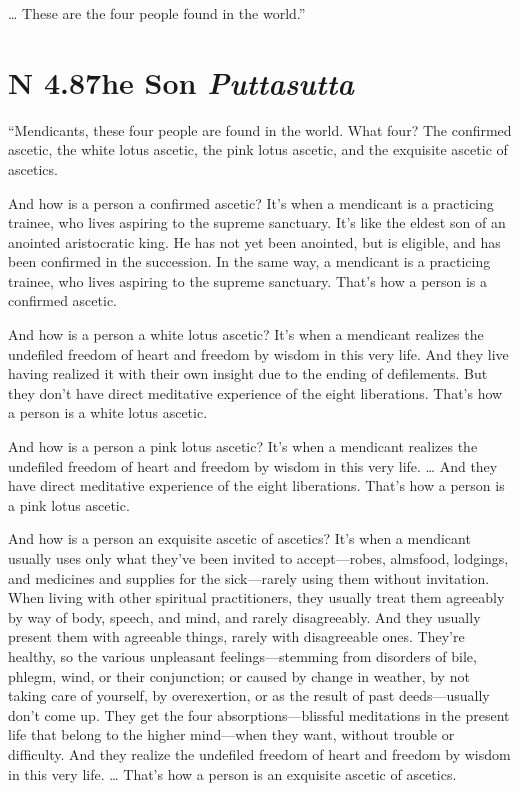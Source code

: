 \documentclass[12pt,openany]{book}%
\newcommand*{\suttatitleacronym}[1]{\smaller[2]{#1}\vspace*{.3em}}
\newcommand*{\suttatitletranslation}[1]{\linebreak{#1}}
\newcommand*{\suttatitleroot}[1]{\linebreak\smaller[2]\itshape{#1}}
\newcommand*{\tocacronym}[1]{\hspace*{-3.3em}{#1}\quad}
\newcommand*{\toctranslation}[1]{#1}
\newcommand*{\tocroot}[1]{(\textit{#1})}
\begin{document}
… These are the four people found in the world.” 

%
\section*{{\suttatitleacronym AN 4.87}{\suttatitletranslation The Son }{\suttatitleroot Puttasutta}}
\addcontentsline{toc}{section}{\tocacronym{AN 4.87} \toctranslation{The Son } \tocroot{Puttasutta}}

“Mendicants, these four people are found in the world. What four? The confirmed ascetic, the white lotus ascetic, the pink lotus ascetic, and the exquisite ascetic of ascetics. 

And how is a person a confirmed ascetic? It’s when a mendicant is a practicing trainee, who lives aspiring to the supreme sanctuary. It’s like the eldest son of an anointed aristocratic king. He has not yet been anointed, but is eligible, and has been confirmed in the succession. In the same way, a mendicant is a practicing trainee, who lives aspiring to the supreme sanctuary. That’s how a person is a confirmed ascetic. 

And how is a person a white lotus ascetic? It’s when a mendicant realizes the undefiled freedom of heart and freedom by wisdom in this very life. And they live having realized it with their own insight due to the ending of defilements. But they don’t have direct meditative experience of the eight liberations. That’s how a person is a white lotus ascetic. 

And how is a person a pink lotus ascetic? It’s when a mendicant realizes the undefiled freedom of heart and freedom by wisdom in this very life. … And they have direct meditative experience of the eight liberations. That’s how a person is a pink lotus ascetic. 

And how is a person an exquisite ascetic of ascetics? It’s when a mendicant usually uses only what they’ve been invited to accept—robes, almsfood, lodgings, and medicines and supplies for the sick—rarely using them without invitation. When living with other spiritual practitioners, they usually treat them agreeably by way of body, speech, and mind, and rarely disagreeably. And they usually present them with agreeable things, rarely with disagreeable ones. They’re healthy, so the various unpleasant feelings—stemming from disorders of bile, phlegm, wind, or their conjunction; or caused by change in weather, by not taking care of yourself, by overexertion, or as the result of past deeds—usually don’t come up. They get the four absorptions—blissful meditations in the present life that belong to the higher mind—when they want, without trouble or difficulty. And they realize the undefiled freedom of heart and freedom by wisdom in this very life. … That’s how a person is an exquisite ascetic of ascetics. 
\end{document}
